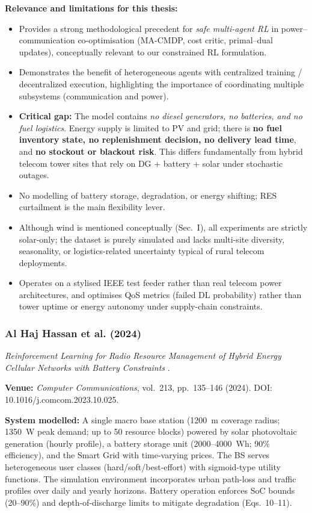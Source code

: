 \textbf{Relevance and limitations for this thesis:}
\begin{itemize}
    \item Provides a strong methodological precedent for \emph{safe multi-agent RL} in power--communication co-optimisation (MA-CMDP, cost critic, primal--dual updates), conceptually relevant to our constrained RL formulation.
    \item Demonstrates the benefit of heterogeneous agents with centralized training / decentralized execution, highlighting the importance of coordinating multiple subsystems (communication and power).
    \item \textbf{Critical gap:} The model contains \emph{no diesel generators, no batteries, and no fuel logistics}. Energy supply is limited to PV and grid; there is \textbf{no fuel inventory state, no replenishment decision, no delivery lead time}, and \textbf{no stockout or blackout risk}. This differs fundamentally from hybrid telecom tower sites that rely on DG + battery + solar under stochastic outages.
    \item No modelling of battery storage, degradation, or energy shifting; RES curtailment is the main flexibility lever.
    \item Although wind is mentioned conceptually (Sec.~I), all experiments are strictly solar-only; the dataset is purely simulated and lacks multi-site diversity, seasonality, or logistics-related uncertainty typical of rural telecom deployments.
    \item Operates on a stylised IEEE test feeder rather than real telecom power architectures, and optimises QoS metrics (failed DL probability) rather than tower uptime or energy autonomy under supply-chain constraints.
\end{itemize}

\subsubsection{Al Haj Hassan et al. (2024)}
\label{sec:al-haj-hassan-et-al}
\textit{Reinforcement Learning for Radio Resource Management of Hybrid Energy Cellular Networks with Battery Constraints} \cite{alhajhassan_2024_battery_ageing_rl}.

\textbf{Venue:} \textit{Computer Communications}, vol.~213, pp.~135--146 (2024). DOI: 10.1016/j.comcom.2023.10.025.

\textbf{System modelled:} A single macro base station (1200~m coverage radius; 1350~W peak demand; up to 50 resource blocks) powered by solar photovoltaic generation (hourly profile), a battery storage unit (2000--4000~Wh; 90\% efficiency), and the Smart Grid with time-varying prices. The BS serves heterogeneous user classes (hard/soft/best-effort) with sigmoid-type utility functions. The simulation environment incorporates urban path-loss and traffic profiles over daily and yearly horizons. Battery operation enforces SoC bounds (20--90\%) and depth-of-discharge limits to mitigate degradation (Eqs.~10--11).

